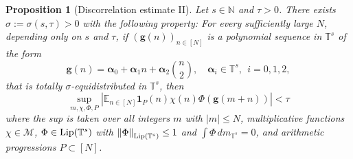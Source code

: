 \documentclass[11pt]{amsart}
\newtheorem{proposition}[lemma]{Proposition}
\theoremstyle{definition}
\begin{document}
\begin{proposition}[Discorrelation estimate II]
\label{lem:equid-square-ab}
 Let $s\in {{\mathbb N}}$ and $\tau>0$. There exists
$\sigma:=\sigma(s,\tau)>0$ with the following property: For every
sufficiently large $N$, depending only on  $s$ and $\tau$, if
$({{\mathbf{g}}}(n))_{n\in[N]}$ is a polynomial sequence in ${{\mathbb T}}^s$ of the form
$$
{{\mathbf{g}}}(n)={{\boldsymbol{\alpha}}}_0+{{\boldsymbol{\alpha}}}_1n+{{\boldsymbol{\alpha}}}_2\binom n2, \quad {{\boldsymbol{\alpha}}}_i\in
{{\mathbb T}}^s,\ \  i=0,1,2,
$$
that is  totally $\sigma$-equidistributed in ${{\mathbb T}}^s$, then
$$
\sup_{m,\chi,\Phi,P}|{{\mathbb E}}_{n\in[N]}{\mathbf{1}}_P(n) \chi(n)\Phi({{\mathbf{g}}}(m+n))|<\tau
$$
where the sup is taken over  all  integers $m$ with $|m|\leq N$,
multiplicative functions $\chi \in{{\mathcal M}}$, $\Phi\in {{\text{\rm Lip}}}({{\mathbb T}}^s)$ with
 ${\lVert \Phi \rVert}_{{{\text{\rm Lip}}}({{\mathbb T}}^s)}\leq 1$ and $\int
\Phi \, dm_{{{\mathbb T}}^s}=0$,  and  arithmetic progressions
$P\subset[N]$.
\end{proposition}
\end{document}
